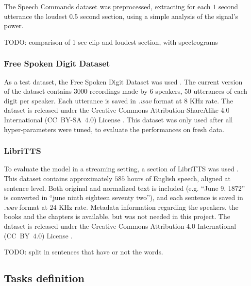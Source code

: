 The Speech Commands dataset was preprocessed, extracting for each $1$ second
utterance the loudest $0.5$ second section, using a simple analysis of the
signal's power.

TODO: comparison of 1 sec clip and loudest section, with spectrograms

\subsubsection{Free Spoken Digit Dataset}

As a test dataset, the Free Spoken Digit Dataset was used
\cite{zohar_jackson_2018_1342401}.
The current version of the dataset contains $3000$ recordings made by $6$
speakers, $50$ utterances of each digit per speaker.
Each utterance is saved in \textit{.wav} format at $8$ KHz rate.
The dataset is released under the Creative Commons 
Attribution-ShareAlike $4.0$ International (CC~BY-SA~$4.0$)
License \cite{ccbysa4}.
This dataset was only used after all hyper-parameters were tuned, to evaluate
the performances on fresh data.

\subsubsection{LibriTTS}

To evaluate the model in a streaming setting, a section of LibriTTS was used
\cite{zen2019libritts}.
This dataset contains approximately $585$ hours of English speech, aligned at
sentence level.
Both original and normalized text is included (e.g. ``June $9$, $1872$'' is
converted in ``june ninth eighteen seventy two''), and each sentence is saved
in \textit{.wav} format at $24$ KHz rate.
Metadata information regarding the speakers, the books and the chapters is
available, but was not needed in this project.
The dataset is released under the Creative Commons Attribution $4.0$
International (CC~BY~$4.0$) License \cite{ccby4}.

TODO: split in sentences that have or not the words.

\subsection{Tasks definition}

